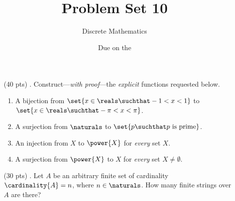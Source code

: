 

\title{Problem Set 10}
\author[Daniel Gonzalez Cedre]{Discrete Mathematics}
\date{Due on the }



\maketitle

\begin{enumerate}
  \item[(40 pts) \quad 1.]
    Construct---\emph{with proof}---the \emph{explicit} functions requested below.
    \begin{enumerate}
      \item
        A bijection from $\set{x \in \reals \suchthat -1 < x < 1}$ to $\set{x \in \reals \suchthat -\pi < x < \pi}$.
      \item
        A surjection from $\naturals$ to $\set{p \suchthat p \text{ is prime}}$.
      \item
        An injection from $X$ to $\power{X}$ for \emph{every} set $X$.
      \item
        A surjection from $\power{X}$ to $X$ for \emph{every} set $X \neq \emptyset$.
    \end{enumerate}


  \item[(30 pts) \quad 2.]
    Let $A$ be an arbitrary finite set of cardinality $\cardinality{A} = n$, where $n \in \naturals$.
    How many finite strings over $A$ are there?


\end{enumerate}
